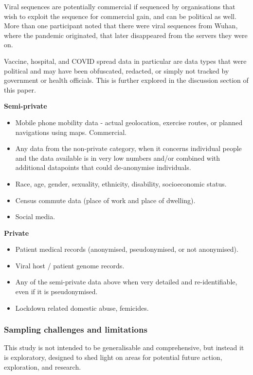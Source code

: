 \documentclass{CUP-JNL-DAP}%
\begin{document}
Viral sequences are potentially commercial if sequenced by organisations that wish to exploit the sequence for commercial gain, and can be political as well. More than one participant noted that there were viral sequences from Wuhan, where the pandemic originated, that later disappeared from the servers they were on. 

Vaccine, hospital, and COVID spread data in particular are data types that were political and may have been obfuscated, redacted, or simply not tracked by government or health officials. This is further explored in the discussion section of this paper.

\textbf{Semi-private}
\begin{itemize}
\item Mobile phone mobility data - actual geolocation, exercise routes, or planned navigations using maps. Commercial. 
\item Any data from the non-private category, when it concerns individual people and the data available is in very low numbers and/or combined with additional datapoints that could de-anonymise individuals. 
\item Race, age, gender, sexuality, ethnicity, disability, socioeconomic status.
\item Census commute data (place of work and place of dwelling). 
\item Social media.
\end{itemize}

\textbf{Private}
\begin{itemize}
\item Patient medical records (anonymised, pseudonymised, or not anonymised).
\item Viral host / patient genome records.
\item Any of the semi-private data above when very detailed and re-identifiable, even if it is pseudonymised.
\item Lockdown related domestic abuse, femicides. 
\end{itemize}

\subsubsection{Sampling challenges and limitations}

This study is not intended to be generalisable and comprehensive, but instead it is exploratory, designed to shed light on areas for potential future action, exploration, and research. 
\end{document}
